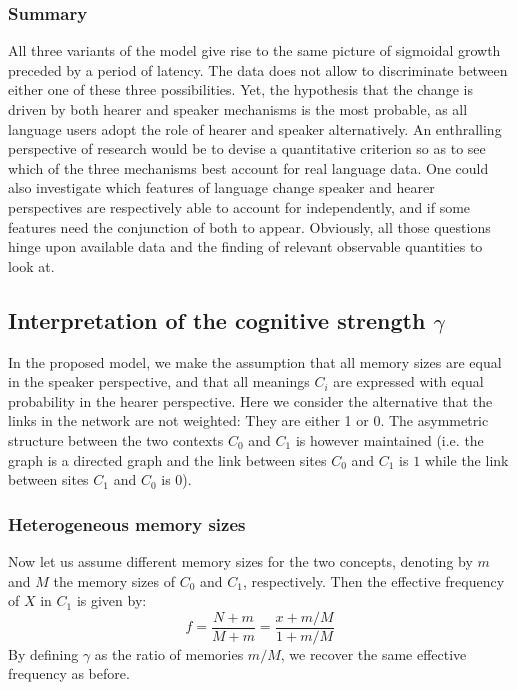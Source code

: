 \documentclass[12pt,twocolumn,amsmath,amssymb,aps,longbibliography]{revtex4-1}  %
\newcommand{\beq}{\begin{equation}}
\newcommand{\eneq}{\end{equation}}
\begin{document}
\subsubsection{Summary}

All three variants of the model give rise to the same picture of sigmoidal growth preceded by a period of latency. The data does not allow to discriminate between either one of these three possibilities. Yet, the hypothesis that the change is driven by both hearer and speaker mechanisms is the most probable, as all language users adopt the role of hearer and speaker alternatively. An enthralling perspective of research would be to devise a quantitative criterion so as to see which of the three mechanisms best account for real language data. One could also investigate which features of language change speaker and hearer perspectives are respectively able to account for independently, and if some features need the conjunction of both to appear. Obviously, all those questions hinge upon available data and the finding of relevant observable quantities to look at. 

\subsection{Interpretation of the cognitive strength $\gamma$ \label{interpret_gamma}}

In the proposed model, we make the assumption that all memory sizes are equal in the speaker perspective, and that all meanings $C_i$ are expressed with equal probability in the hearer perspective. Here we consider the alternative that the links in the network are not weighted: They are either 1 or 0. The asymmetric structure between the two contexts $C_0$ and $C_1$ is however maintained (i.e. the graph is a directed graph and the link between sites $C_0$ and $C_1$ is $1$ while the link between sites $C_1$ and $C_0$ is $0$). 

\subsubsection{Heterogeneous memory sizes} 

Now let us assume different memory sizes for the two concepts, denoting by $m$ and $M$ the memory sizes of $C_0$ and $C_1$, respectively. Then the effective frequency of $X$ in $C_1$ is given by:
\beq
f = \frac{N + m}{M+m} = \frac{x + m/M}{1+m/M}
\eneq
By defining $\gamma$ as the ratio of memories $m/M$, we recover the same effective frequency as before. 
\end{document}

